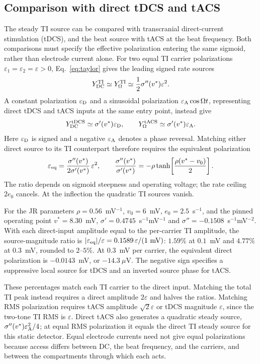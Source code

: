 \documentclass[11pt,a4paper]{article}
\newcommand{\Sig}{\sigma}
\begin{document}
\subsection{Comparison with direct tDCS and tACS}\label{sec:direct-comparison}
The steady TI source can be compared with transcranial direct-current stimulation
(tDCS), and the beat source with tACS at the beat frequency. Both comparisons
must specify the effective polarization entering the same sigmoid, rather than electrode
current alone. For two equal TI carrier polarizations
$\varepsilon_1=\varepsilon_2=\varepsilon>0$, Eq.~\eqref{eq:taylor} gives the leading
signed rate sources
\[
Y_{\rm DC}^{\rm TI}\simeq Y_\Omega^{\rm TI}
\simeq \frac{1}{2}\Sig''(v^*)\varepsilon^2.
\]
A constant polarization $\varepsilon_{\rm D}$ and a sinusoidal polarization
$\varepsilon_{\rm A}\cos\Omega t$, representing direct tDCS and tACS inputs at
the same entry point, instead give
\[
Y_{\rm DC}^{\rm tDCS}\simeq\Sig'(v^*)\varepsilon_{\rm D},
\qquad
Y_\Omega^{\rm tACS}\simeq\Sig'(v^*)\varepsilon_{\rm A}.
\]
Here $\varepsilon_{\rm D}$ is signed and a negative $\varepsilon_{\rm A}$ denotes
a phase reversal. Matching either direct source to its TI counterpart therefore
requires the equivalent polarization
\[
\varepsilon_{\rm eq}
=\frac{\Sig''(v^*)}{2\Sig'(v^*)}\,\varepsilon^2,
\qquad
\frac{\Sig''(v^*)}{\Sig'(v^*)}
=-\rho\tanh\!\left[\frac{\rho(v^*-v_0)}{2}\right].
\]
The ratio depends on sigmoid steepness and operating voltage; the rate ceiling
$2e_0$ cancels. At the inflection the quadratic TI sources vanish.

For the JR parameters $\rho=0.56$~mV$^{-1}$, $v_0=6$~mV,
$e_0=2.5$~s$^{-1}$, and the pinned operating point $v^*=8.30$~mV,
$\Sig'=0.4745$~s$^{-1}$mV$^{-1}$ and
$\Sig''=-0.1508$~s$^{-1}$mV$^{-2}$. With each direct-input amplitude
equal to the per-carrier TI amplitude, the source-magnitude ratio is
$|\varepsilon_{\rm eq}|/\varepsilon
=0.1589\,\varepsilon/(1~\mathrm{mV})$:
$1.59\%$ at $0.1$~mV and $4.77\%$ at $0.3$~mV, rounded to $2$--$5\%$.
At $0.3$~mV per carrier, the equivalent direct polarization is
$-0.0143$~mV, or $-14.3~\mu$V. The negative sign specifies a suppressive
local source for tDCS and an inverted source phase for tACS.

These percentages match each TI carrier to the direct input. Matching the
total TI peak instead requires a direct amplitude $2\varepsilon$ and halves
the ratios. Matching RMS polarization requires tACS amplitude
$\sqrt{2}\varepsilon$ or tDCS magnitude $\varepsilon$, since the two-tone
TI RMS is $\varepsilon$. Direct tACS also generates a quadratic steady
source, $\Sig''(v^*)\varepsilon_{\rm A}^2/4$; at equal RMS polarization it
equals the direct TI steady source for this static detector. Equal
electrode currents need not give equal polarizations because access differs
between DC, the beat frequency, and the carriers, and between the compartments
through which each acts.
\end{document}
